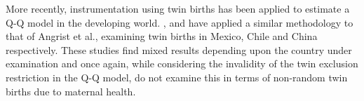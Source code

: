 More recently, instrumentation using twin births has been applied to estimate a Q-Q model in the developing world. \citet{FitzsimonsMalde2010}, \citet{Sanhueza2009} and \citet{Lietal2008} have applied a similar methodology to that of Angrist et al., examining twin births in Mexico, Chile and China respectively.  These studies find mixed results depending upon the country under examination and once again, while considering the invalidity of the twin exclusion restriction in the Q-Q model, do not examine this in terms of non-random twin births due to maternal health. 





























